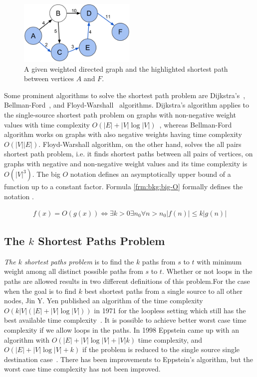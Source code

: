 \begin{figure}[!ht]
  \centering
  \includegraphics[width=0.5\textwidth]{figs/background/Shortest_path_with_direct_weights}
  \caption{A given weighted directed graph and the highlighted shortest path between vertices $A$ and $F$.}
  \label{fig:shortest-path1}
\end{figure}

Some prominent algorithms to solve the shortest path problem are Dijkstra's~\cite{dijkstra}, Bellman-Ford~\cite{bellman-ford}, and Floyd-Warshall~\cite{floyd-warshall} algorithms. Dijkstra's algorithm applies to the single-source shortest path problem on graphs with non-negative weight values with time complexity $O(|E| + |V| \log |V|)$~\cite{fredman1987fibonacci}, whereas Bellman-Ford algorithm works on graphs with also negative weights having time complexity $O(|V| |E|)$. Floyd-Warshall algorithm, on the other hand, solves the all pairs shortest path problem, i.e. it finds shortest paths between all pairs of vertices, on graphs with negative and non-negative weight values and its time complexity is $O(|V|^3)$. The big $O$ notation defines an asymptotically upper bound of a function up to a constant factor. Formula \ref{frm:bkg:big-O} formally defines the notation \cite{thomas2001introduction}. 

\begin{align}
  f(x) = O(g(x)) \iff \exists k > 0 \exists n_0 \forall n > n_0 |f(n)| \leq k|g(n)|
  \label{frm:bkg:big-O}
\end{align}


\subsection{The $k$ Shortest Paths Problem}
\emph{The $k$ shortest paths problem} is to find the $k$ paths from $s$ to $t$ with minimum weight among all distinct possible paths from $s$ to $t$. Whether or not loops in the paths are allowed results in two different definitions of this problem.For the case when the goal is to find $k$ best shortest paths from a single source to all other nodes, Jin Y. Yen published an algorithm of the time complexity $O(k |V|(|E|+|V|\log|V|))$ in 1971 for the loopless setting which still has the best available time complexity~\cite{yen1971finding}. It is possible to achieve better worst case time complexity if we allow loops in the paths. In 1998 Eppstein came up with an algorithm with $O(|E| + |V|\log|V| + |V| k)$ time complexity, and $O(|E| + |V|\log|V| + k)$ if the problem is reduced to the single source single destination case~\cite{eppstein1998finding}. There has been improvements to Eppstein's algorithm, but the worst case time complexity has not been improved.

